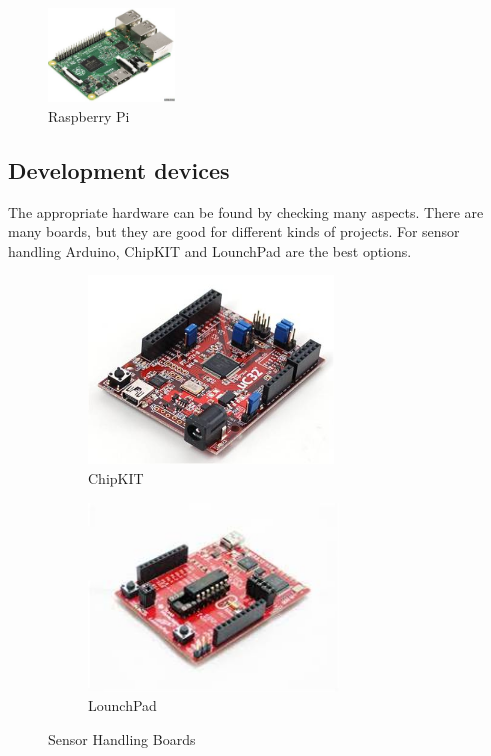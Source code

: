 \begin{figure}[ht]
    \centering
    \includegraphics[width=0.3\textwidth]{figures/Raspberry Pi.jpg}
    \caption{Raspberry Pi}
\end{figure}

\subsection{Development devices}
The appropriate hardware can be found by checking many aspects. There are many boards, but they are good for different kinds of projects.  
For sensor handling Arduino, ChipKIT and LounchPad are the best options.  

\begin{figure}[ht]

\begin{subfigure}{0.5\textwidth}
    \includegraphics[width=0.9\linewidth, height=5cm]{figures/ChipKIT.jpg}
    \caption{ChipKIT}
\end{subfigure}
\begin{subfigure}{0.4\textwidth}
    \includegraphics[width=0.9\linewidth, height=5cm]{figures/LounchPad.jpg}
    \caption{LounchPad}
\end{subfigure}

\caption{Sensor Handling Boards}
\end{figure}

